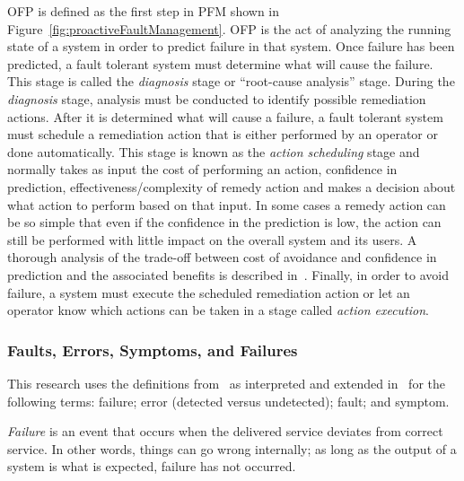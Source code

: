 
\ac{OFP} is defined as the first step in \ac{PFM} shown in
Figure~\ref{fig:proactiveFaultManagement}.  \ac{OFP} is the act of analyzing
the running state of a system in order to predict failure in that system. Once
failure has been predicted, a fault tolerant system must determine what will
cause the failure.  This stage is called the \emph{diagnosis} stage or
``root-cause analysis'' stage.  During the \emph{diagnosis} stage, analysis
must be conducted to identify possible remediation actions.  After it is
determined what will cause a failure, a fault tolerant system must schedule a
remediation action that is either performed by an operator or done
automatically.  This stage is known as the \emph{action scheduling} stage and
normally takes as input the cost of performing an action, confidence in
prediction, effectiveness/complexity of remedy action and makes a decision
about what action to perform based on that input.  In some cases a remedy
action can be so simple that even if the confidence in the prediction is low,
the action can still be performed with little impact on the overall system and
its users.  A thorough analysis of the trade-off between cost of avoidance and
confidence in prediction and the associated benefits is described
in~\cite{candea2004microreboot}.  Finally, in order to avoid failure, a system
must execute the scheduled remediation action or let an operator know which
actions can be taken in a stage called \emph{action execution}.

\subsubsection{Faults, Errors, Symptoms, and Failures}
This research uses the definitions from~\cite{avivzienis2004basic} as
interpreted and extended in~\cite{salfnerSurvey} for the following terms:
failure; error (detected versus undetected); fault; and symptom.

\emph{Failure} is an event that occurs when the delivered service deviates from
correct service.  In other words, things can go wrong internally; as long as
the output of a system is what is expected, failure has not occurred.  

